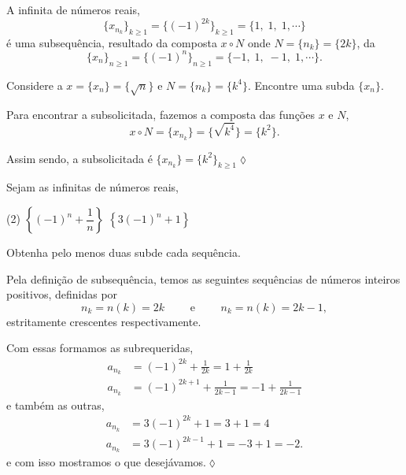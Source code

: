 \begin{exer}
A \seq infinita de n\'{u}meros reais,
$$
\{x_{n_{k}}\}_{k\geq 1}=\{(-1)^{2k}\}_{k\geq 1}=\{1,\; 1, \; 1,\cdots \}
$$
\'e uma subsequ\^{e}ncia, resultado da composta $x\circ N$ onde $N=\{ n_k\}=\{2k\}$, da \seq
$$
\{x_n\}_{n\geq 1}=\{(-1)^n\}_{n\geq 1}=\{-1,\; 1, \; -1, \; 1,\cdots\}.
$$
\end{exer}


\begin{exer}
Considere a \seqs $x=\{ x_n\}=\{\sqrt{n}\}$ e $N=\{n_k\}=\{ k^4\}$. Encontre uma sub\seq da \seq $\{x_n\}$.
\end{exer}

\solo Para encontrar a sub\seq solicitada, fazemos a composta das fun\c{c}\~{o}es \seq $x$ e $N$,
\begin{equation*}
    x\circ N=\{x_{n_k}\}=\{ \sqrt{k^4}\}=\{k^2\}.
\end{equation*}

Assim sendo, a sub\seq solicitada \'{e} $\{ x_{n_k}\}=\{k^2\}_{k\geq 1}$\hfill \(\lozenge\)

\begin{exer}
Sejam as \seqs infinitas de n\'{u}meros reais,
\begin{tasks}[label=\rm{(\alph*)},item-indent=5em,label-width=4ex,ref=(\alph*)](2)
\task  \(\left\{(-1)^n+\dfrac{1}{n}\right\}\)
\task  \(\left\{3(-1)^n+1 \right\}\)
\end{tasks}
Obtenha pelo menos duas sub\seqs de cada sequ\^{e}ncia.
\end{exer}

\solo Pela defini\c{c}\~{a}o de subsequ\^{e}ncia,  temos as seguintes sequ\^{e}ncias de n\'{u}meros inteiros positivos, definidas por
\begin{equation*}
    n_k=n(k)=2k\qquad \text{ e }\qquad n_k=n(k)=2k-1,
\end{equation*}
estritamente crescentes respectivamente.

Com essas \seqs formamos as sub\seqs requeridas,
\begin{align*}
    a_{n_k}&=(-1)^{2k}+\frac{1}{2k}=1+\frac{1}{2k}\\[2ex]
a_{n_k}&=(-1)^{2k+1}+\frac{1}{2k-1}=-1+\frac{1}{2k-1}
\end{align*}
e tamb\'{e}m as outras,
\begin{align*}
    a_{n_k}&=3(-1)^{2k}+1=3+1=4 \\[2ex]
a_{n_k}&=3(-1)^{2k-1}+1=-3+1=-2.
\end{align*}
e com isso mostramos o que desejávamos.\hfill \(\lozenge\)

